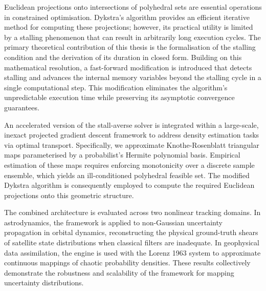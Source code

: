 Euclidean projections onto intersections of polyhedral sets are essential operations in constrained optimisation. Dykstra's algorithm provides an efficient iterative method for computing these projections; however, its practical utility is limited by a stalling phenomenon that can result in arbitrarily long execution cycles. The primary theoretical contribution of this thesis is the formalisation of the stalling condition and the derivation of its duration in closed form. Building on this mathematical resolution, a fast-forward modification is introduced that detects stalling and advances the internal memory variables beyond the stalling cycle in a single computational step. This modification eliminates the algorithm's unpredictable execution time while preserving its asymptotic convergence guarantees.

An accelerated version of the stall-averse solver is integrated within a large-scale, inexact projected gradient descent framework to address density estimation tasks via optimal transport. Specifically, we approximate Knothe-Rosenblatt triangular maps parameterised by a probabilist's Hermite polynomial basis. Empirical estimation of these maps requires enforcing monotonicity over a discrete sample ensemble, which yields an ill-conditioned polyhedral feasible set. The modified Dykstra algorithm is consequently employed to compute the required Euclidean projections onto this geometric structure.

The combined architecture is evaluated across two nonlinear tracking domains. In astrodynamics, the framework is applied to non-Gaussian uncertainty propagation in orbital dynamics, reconstructing the physical ground-truth shears of satellite state distributions when classical filters are inadequate. In geophysical data assimilation, the engine is used with the Lorenz 1963 system to approximate continuous mappings of chaotic probability densities. These results collectively demonstrate the robustness and scalability of the framework for mapping uncertainty distributions.